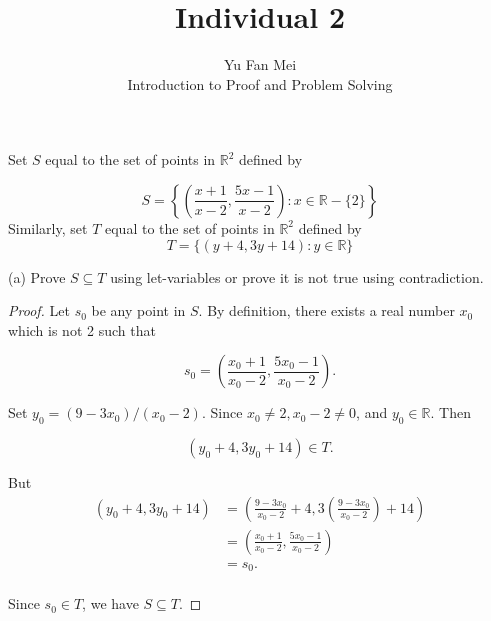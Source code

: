 \documentclass[12pt]{article}
\newenvironment{problem}[2][Problem]{\begin{trivlist}
\item[\hskip \labelsep {\bfseries #1}\hskip \labelsep {\bfseries #2.}]}{\end{trivlist}}
\begin{document}
 
 
\title{Individual 2}%
\author{Yu Fan Mei\\ %
Introduction to Proof and Problem Solving} %
 
\maketitle
\begin{problem}{1}Set $S$ equal to the set of points in $\mathbb{R}^2$ defined by 

    $$S =  \left\{ \left( \frac{x + 1}{x - 2}, \frac{5x - 1}{x - 2} \right) : x \in \mathbb{R} - \{2\} \right\} $$
Similarly, set $T$ equal to the set of points in $\mathbb{R}^2$ defined by
    $$T =  \{ ( y + 4, 3y + 14 ) : y \in \mathbb{R} \} $$

 
(a) %
Prove $S \subseteq T$ using let-variables or prove it is not true using contradiction.

\end{problem}
\begin{proof} Let $s_{0}$ be any point in $S$. By definition, there exists a real number $x_{0}$ which is not 2 such that 

$$s_{0} = \left( \frac{x_{0} + 1}{x_{0} - 2}, \frac{5x_{0} - 1}{x_{0} - 2} \right).$$

Set $y_{0} = (9 - 3x_{0} ) / (x_{0} - 2 )$. Since $x_{0} \neq 2, x_{0} - 2 \neq 0 $, and $y_{0} \in \mathbb{R}$. Then 

$$ \left( y_{0} + 4, 3y_{0} + 14 \right) \in T. $$

But
\begin{align*}
    \left( y_{0} + 4, 3y_{0} + 14 \right) & = \left( \frac{9 - 3x_{0}}{x_{0} - 2} + 4, 3\left( \frac{9 - 3x_{0}}{x_{0} - 2} \right) + 14 \right)\\
    & = \left( \frac{x_{0} + 1}{x_{0} - 2}, \frac{5x_{0} - 1}{x_{0} - 2} \right)\\
    & = s_{0}.\\
\end{align*}

Since $s_{0} \in T$, we have $S \subseteq T$.
\end{proof}
\end{document}
